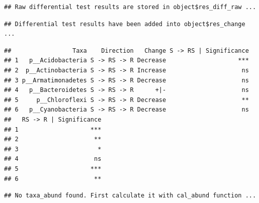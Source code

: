 \documentclass[
]{book}
\newenvironment{Shaded}{\begin{snugshade}}{\end{snugshade}}
\newcommand{\AttributeTok}[1]{\textcolor[rgb]{0.77,0.63,0.00}{#1}}
\newcommand{\CommentTok}[1]{\textcolor[rgb]{0.56,0.35,0.01}{\textit{#1}}}
\newcommand{\ConstantTok}[1]{\textcolor[rgb]{0.00,0.00,0.00}{#1}}
\newcommand{\FloatTok}[1]{\textcolor[rgb]{0.00,0.00,0.81}{#1}}
\newcommand{\FunctionTok}[1]{\textcolor[rgb]{0.00,0.00,0.00}{#1}}
\newcommand{\NormalTok}[1]{#1}
\newcommand{\OtherTok}[1]{\textcolor[rgb]{0.56,0.35,0.01}{#1}}
\newcommand{\SpecialCharTok}[1]{\textcolor[rgb]{0.00,0.00,0.00}{#1}}
\newcommand{\StringTok}[1]{\textcolor[rgb]{0.31,0.60,0.02}{#1}}
\begin{document}
\begin{verbatim}
## Raw differential test results are stored in object$res_diff_raw ...
\end{verbatim}

\begin{verbatim}
## Differential test results have been added into object$res_change ...
\end{verbatim}

\begin{Shaded}
\end{Shaded}

\begin{verbatim}
##                 Taxa    Direction   Change S -> RS | Significance
## 1   p__Acidobacteria S -> RS -> R Decrease                    ***
## 2  p__Actinobacteria S -> RS -> R Increase                     ns
## 3 p__Armatimonadetes S -> RS -> R Decrease                     ns
## 4   p__Bacteroidetes S -> RS -> R      +|-                     ns
## 5     p__Chloroflexi S -> RS -> R Decrease                     **
## 6   p__Cyanobacteria S -> RS -> R Decrease                     ns
##   RS -> R | Significance
## 1                    ***
## 2                     **
## 3                      *
## 4                     ns
## 5                    ***
## 6                     **
\end{verbatim}

\begin{Shaded}
\end{Shaded}

\begin{verbatim}
## No taxa_abund found. First calculate it with cal_abund function ...
\end{verbatim}
\end{document}

